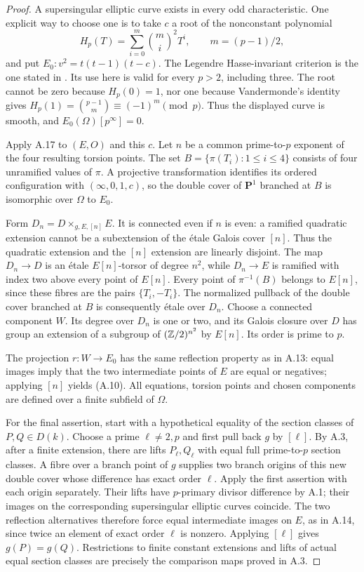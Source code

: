 \begin{proof}
A supersingular elliptic curve exists in every odd
characteristic. One explicit way to choose one is to take
$c$ a root of the nonconstant polynomial
\[
 H_p(T)=\sum_{i=0}^{m}\binom mi^2T^i,
 \qquad m=(p-1)/2,
\]
and put $E_0:v^2=t(t-1)(t-c)$. The Legendre
Hasse-invariant criterion is the one stated in
\citet[\S1, equations (1.2)--(1.3)]{A_Finotti2009}.
Its use here is valid for every $p>2$, including three.
The root cannot be zero because $H_p(0)=1$, nor one
because Vandermonde's identity gives
$H_p(1)=\binom{p-1}{m}\equiv(-1)^m\pmod p$.
Thus the displayed curve is smooth, and
$E_0(\Omega)[p^\infty]=0$.

Apply A.17 to $(E,O)$ and this $c$. Let $n$ be a common
prime-to-$p$ exponent of the four resulting torsion points.
The set $B=\{\pi(T_i):1\le i\le4\}$ consists of four
unramified values of $\pi$. A projective transformation
identifies its ordered configuration with
$(\infty,0,1,c)$, so the double cover of $\mathbf P^1$
branched at $B$ is isomorphic over $\Omega$ to $E_0$.

Form $D_n=D\times_{g,E,[n]}E$. It is connected even if
$n$ is even: a ramified quadratic extension cannot be a
subextension of the \'etale Galois cover $[n]$. Thus the
quadratic extension and the $[n]$ extension are linearly
disjoint. The map $D_n\to D$ is an \'etale $E[n]$-torsor
of degree $n^2$, while $D_n\to E$ is ramified with index
two above every point of $E[n]$. Every point of
$\pi^{-1}(B)$ belongs to $E[n]$, since these fibres are
the pairs $\{T_i,-T_i\}$. The normalized pullback of the
double cover branched at $B$ is consequently \'etale over
$D_n$. Choose a connected component $W$. Its degree over
$D_n$ is one or two, and its Galois closure over $D$ has
group an extension of a subgroup of $(\mathbb Z/2)^{n^2}$ by
$E[n]$. Its order is prime to $p$.

The projection $r:W\to E_0$ has the same reflection property
as in A.13: equal images imply that the two intermediate
points of $E$ are equal or negatives; applying $[n]$ yields
(A.10). All equations, torsion points and chosen components
are defined over a finite subfield of $\Omega$.

For the final assertion, start with a hypothetical equality
of the section classes of $P,Q\in D(k)$. Choose a prime
$\ell\ne2,p$ and first pull back $g$ by $[\ell]$. By A.3,
after a finite extension, there are lifts $P_\ell,Q_\ell$
with equal full prime-to-$p$ section classes. A fibre over
a branch point of $g$ supplies two branch origins of this
new double cover whose difference has exact order $\ell$.
Apply the first assertion with each origin separately.
Their lifts have $p$-primary divisor difference by A.1;
their images on the corresponding supersingular elliptic
curves coincide. The two reflection alternatives therefore
force equal intermediate images on $E$, as in A.14,
since twice an element of exact order $\ell$ is nonzero.
Applying $[\ell]$ gives $g(P)=g(Q)$. Restrictions to finite
constant extensions and lifts of actual equal section
classes are precisely the comparison maps proved in A.3.
\end{proof}

